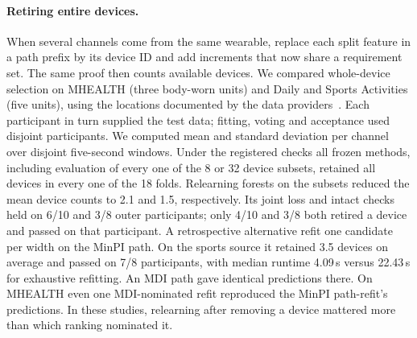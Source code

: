\paragraph{Retiring entire devices.}
When several channels come from the same wearable, replace each split
feature in a path prefix by its device ID and add increments that now
share a requirement set. The same proof then counts available devices.
We compared whole-device selection on MHEALTH (three body-worn units)
and Daily and Sports Activities (five units), using the locations
documented by the data providers~\citep{banos2014mhealth,altun2010dsads}.
Each participant in turn supplied the test data; fitting, voting and
acceptance used disjoint participants. We computed mean and standard
deviation per channel over disjoint five-second windows. Under the
registered checks all frozen methods, including evaluation of every
one of the 8 or 32 device subsets, retained all devices in every one
of the 18 folds. Relearning forests on the subsets reduced the mean
device counts to 2.1 and 1.5, respectively. Its joint loss and intact
checks held on 6/10 and 3/8 outer participants; only 4/10 and 3/8 both
retired a device and passed on that participant. A retrospective
alternative refit one candidate per width on the MinPI path. On the sports
source it retained 3.5 devices on average and passed on 7/8 participants,
with median runtime 4.09\,s versus 22.43\,s for exhaustive refitting.
An MDI path gave identical predictions there. On MHEALTH even one
MDI-nominated refit reproduced the MinPI path-refit's predictions.
In these studies, relearning after removing a device mattered more
than which ranking nominated it.

